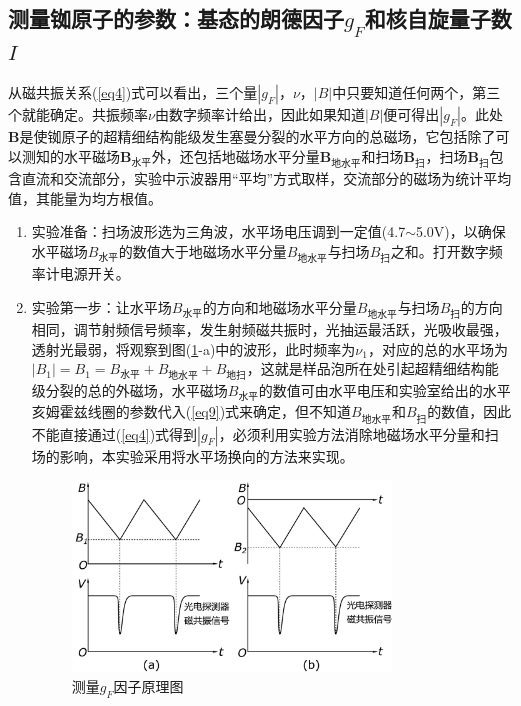 \documentclass[a4paper]{article}
\begin{document}
\subsection{测量铷原子的参数：基态的朗德因子$g_F$和核自旋量子数$I$}
从磁共振关系(\ref{eq4})式可以看出，三个量$|g_F|$，$\nu$，$|B|$中只要知道任何两个，第三个就能确定。共振频率$\nu$由数字频率计给出，因此如果知道$|B|$便可得出$|g_F|$。此处$\bm{B}$是使铷原子的超精细结构能级发生塞曼分裂的水平方向的总磁场，它包括除了可以测知的水平磁场$\bm{B}_{\text{水平}}$外，还包括地磁场水平分量$\bm{B}_{\text{地水平}}$和扫场$\bm{B}_{\text{扫}}$，扫场$\bm{B}_{\text{扫}}$包含直流和交流部分，实验中示波器用“平均”方式取样，交流部分的磁场为统计平均值，其能量为均方根值。
\begin{enumerate}
\item 实验准备：扫场波形选为三角波，水平场电压调到一定值(4.7$\sim$5.0V)，以确保水平磁场$B_{\text{水平}}$的数值大于地磁场水平分量$B_{\text{地水平}}$与扫场$B_{\text{扫}}$之和。打开数字频率计电源开关。
\item 实验第一步：让水平场$B_{\text{水平}}$的方向和地磁场水平分量$B_{\text{地水平}}$与扫场$B_{\text{扫}}$的方向相同，调节射频信号频率，发生射频磁共振时，光抽运最活跃，光吸收最强，透射光最弱，将观察到图(\ref{fig5}-a)中的波形，此时频率为$\nu_1$，对应的总的水平场为$|B_1| = B_1 = B_{\text{水平}} + B_{\text{地水平}} + B_{\text{地扫}}$，这就是样品泡所在处引起超精细结构能级分裂的总的外磁场，水平磁场$B_{\text{水平}}$的数值可由水平电压和实验室给出的水平亥姆霍兹线圈的参数代入(\ref{eq9})式来确定，但不知道$B_{\text{地水平}}$和$B_{\text{扫}}$的数值，因此不能直接通过(\ref{eq4})式得到$|g_F|$，必须利用实验方法消除地磁场水平分量和扫场的影响，本实验采用将水平场换向的方法来实现。
\begin{figure}[!h]
\centering
\includegraphics[width=0.8\textwidth]{fig/fig5.pdf}
\caption{测量$g_F$因子原理图}\label{fig5}
\end{figure}

\end{enumerate}
\end{document}
